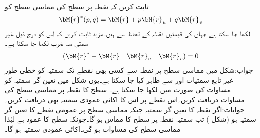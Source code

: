 \quad ثابت کریں کہ نقطہ  پر سطح  کی مماسی سطح کو 
\begin{align}\label{مساوات_سوال_خطی_تکمل_مماسی_سطح_عمومی}
\bM{r}^*(p,q)=\bM{r}+p\bM{r}_u+q\bM{r}_v
\end{align}
لکھا جا سکتا ہے جہاں  کی قیمتیں نقطہ  کے لحاظ سے ہیں۔مزید ثابت کریں کہ اس کو درج ذیل غیر سمتی سہ ضرب لکھا جا سکتا ہے۔
\begin{align*}
(\bM{r}^*-\bM{r}\quad \bM{r}_u\quad \bM{r}_v)=0
\end{align*}
جواب:\quad شکل  میں مماسی سطح پر نقطہ  سے کسی بھی نقطے تک سمتیہ کو خطی طور غیر تابع سمتیات  اور  سے ظاہر کیا جا سکتا ہے۔یوں شکل  میں  تعین گر سمتیہ  کو  مساوات  کی صورت میں لکھا جا سکتا ہے۔
\quad سطح  کا نقطہ  پر  مماسی سطح کی مساوات دریافت کریں۔اس نقطے پر اس کا اکائی عمودی سمتیہ بھی دریافت کریں۔\\
جوابات:\quad اگر نقطہ  کا تعین گر سمتیہ    جبکہ مماسی سطح پر عمومی نقطے کا تعین گر سمتیہ  ہو (شکل ) تب سمتیہ  نقطہ  پر سطح کا مماس ہو گا۔چونکہ  سطح کا عمود ہے لہٰذا مماسی سطح کی مساوات  ہو گی۔اکائی عمودی سمتیہ  ہو گا۔ 
